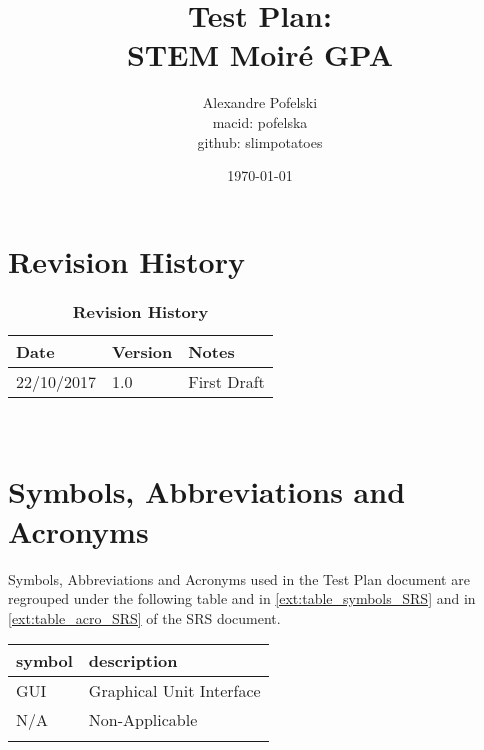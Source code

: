 \documentclass[12pt, titlepage]{article}
\begin{document}
\title{Test Plan:\\
		STEM Moir{\'e} GPA} 
\author{Alexandre Pofelski \\
		macid: pofelska \\
		github: slimpotatoes}
\date{\today}
	
\maketitle


\section{Revision History}

\begin{table}[h]
\caption{\bf Revision History}
\begin{tabularx}{\textwidth}{p{3cm}p{2cm}X}
\toprule {\bf Date} & {\bf Version} & {\bf Notes}\\
\midrule
22/10/2017 & 1.0 & First Draft\\
\bottomrule
\end{tabularx}
\end{table}

~\newpage

\section{Symbols, Abbreviations and Acronyms}
\label{symbols}

Symbols, Abbreviations and Acronyms used in the Test Plan document are regrouped under the following table and in \cref{ext:table_symbols_SRS} and in \cref{ext:table_acro_SRS} of the SRS document. \par\medskip

\renewcommand{\arraystretch}{1.2}
\begin{tabular}{l l} 
  \toprule		
  \textbf{symbol} & \textbf{description}\\
  \midrule 
  GUI & Graphical Unit Interface \\
  N/A & Non-Applicable \\
  \bottomrule
  \label{table_acro_Test_Plan}
\end{tabular}


\newpage

\tableofcontents

\listoftables

\listoffigures
\end{document}
